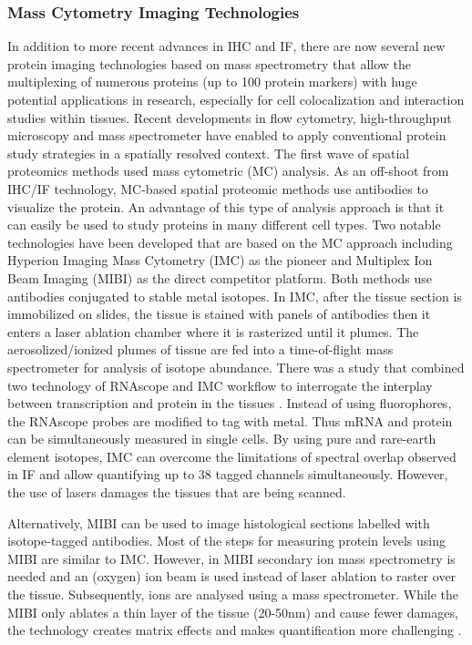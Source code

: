 \subsubsection{Mass Cytometry Imaging Technologies}
In addition to more recent advances in IHC and IF, there are now several new protein imaging technologies based on mass spectrometry that allow the multiplexing of numerous proteins (up to 100 protein markers) with huge potential applications in research, especially for cell colocalization and interaction studies within tissues. Recent developments in flow cytometry, high-throughput microscopy and mass spectrometer have enabled to apply conventional protein study strategies in a spatially resolved context. The first wave of spatial proteomics methods used mass cytometric (MC) analysis. As an off-shoot from IHC/IF technology, MC-based spatial proteomic methods use antibodies to visualize the protein. An advantage of this type of analysis approach is that it can easily be used to study proteins in many different cell types. Two notable technologies have been developed that are based on the MC approach including Hyperion Imaging Mass Cytometry (IMC) as the pioneer and Multiplex Ion Beam Imaging (MIBI) as the direct competitor platform. Both methods use antibodies conjugated to stable metal isotopes. In IMC, after the tissue section is immobilized on slides, the tissue is stained with panels of antibodies then it enters a laser ablation chamber where it is rasterized until it plumes. The aerosolized/ionized plumes of tissue are fed into a time-of-flight mass spectrometer for analysis of isotope abundance.  There was a study that combined two technology of RNAscope and IMC workflow to interrogate the interplay between transcription and protein in the tissues \cite{schulz2018simultaneous}. Instead of using fluorophores, the RNAscope probes are modified to tag with metal. Thus mRNA and protein can be simultaneously measured in single cells. By using pure and rare-earth element isotopes, IMC can overcome the limitations of spectral overlap observed in IF and allow quantifying up to 38 tagged channels simultaneously. However, the use of lasers damages the tissues that are being scanned.

Alternatively, MIBI can be used to image histological sections labelled with isotope-tagged antibodies. Most of the steps for measuring protein levels using MIBI are similar to IMC. However, in MIBI secondary ion mass spectrometry is needed and  an (oxygen) ion beam is used instead of laser ablation to raster over the tissue. Subsequently, ions are analysed using a mass spectrometer. While the MIBI only ablates a thin layer of the tissue (20-50nm) and cause fewer damages, the technology creates matrix effects and makes quantification more challenging \cite{bodenmiller2016multiplexed}.

